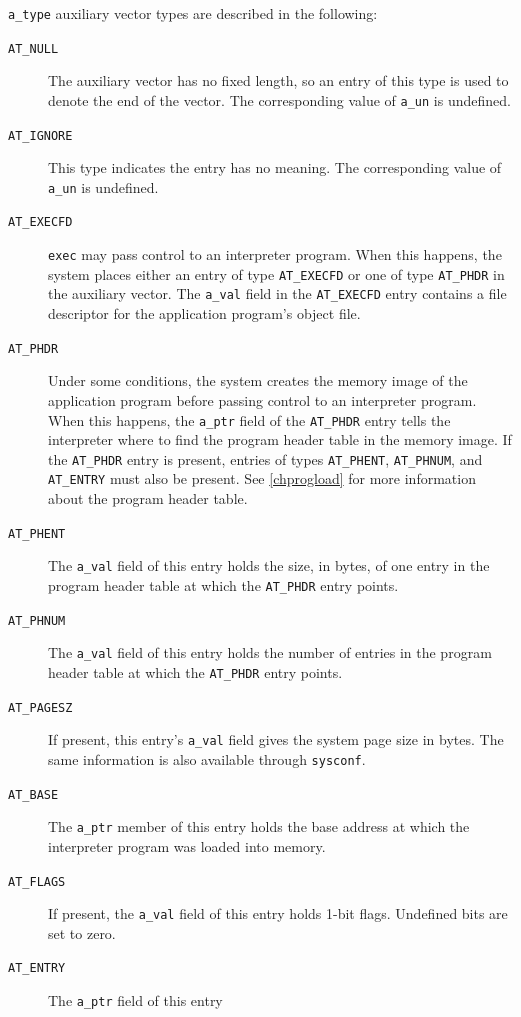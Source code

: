 \documentclass[USenglish,fontsize=11pt,twoside,%
  toc=bib,toc=idx,toc=graduated,numbers=noendperiod,
  bookmarks=true,
  bookmarksnumbered=true,
  bookmarksopen=true,
  bookmarksopenlevel=1,
  breaklinks=true,
  colorlinks=true,
  linkcolor=black,
  pdfpagelayout={TwoPageRight},
  pdfusetitle=true
]{scrreprt}
\begin{document}
\texttt{a\_type} auxiliary vector types are described in the
following:
\begin{description}
\item[\texttt{AT\_NULL}] The auxiliary vector has no fixed length, so
  an entry of this type is used to denote the end of the vector.  The
  corresponding value of \texttt{a\_un} is undefined.
\item[\texttt{AT\_IGNORE}] This type indicates the entry has no
  meaning.  The corresponding value of \texttt{a\_un} is undefined.
\item[\texttt{AT\_EXECFD}] \texttt{exec} may pass control to an interpreter
  program.  When this happens, the system places either an entry of
  type \texttt{AT\_EXECFD} or one of type \texttt{AT\_PHDR} in the
  auxiliary vector.  The \texttt{a\_val} field in the
  \texttt{AT\_EXECFD} entry contains a file descriptor for the
  application program's object file.
\item[\texttt{AT\_PHDR}] Under some conditions, the system creates the
  memory image of the application program before passing control to an
  interpreter program.  When this happens, the \texttt{a\_ptr} field of
  the \texttt{AT\_PHDR} entry tells the interpreter where to find the
  program header table in the memory image.  If the \texttt{AT\_PHDR}
  entry is present, entries of types \texttt{AT\_PHENT},
  \texttt{AT\_PHNUM}, and \texttt{AT\_ENTRY} must also be present.  See
  \cref{chprogload} for more information about the program header
  table.
\item[\texttt{AT\_PHENT}] The \texttt{a\_val} field of this entry
  holds the size, in bytes, of one entry in the program header table
  at which the \texttt{AT\_PHDR} entry points.
\item[\texttt{AT\_PHNUM}] The \texttt{a\_val} field of this entry
  holds the number of entries in the program header table at which the
  \texttt{AT\_PHDR} entry points.
\item[\texttt{AT\_PAGESZ}] If present, this entry's \texttt{a\_val}
  field gives the system page size in bytes.  The same information is
  also available through \texttt{sysconf}.
\item[\texttt{AT\_BASE}] The \texttt{a\_ptr} member of this entry
  holds the base address at which the interpreter program was loaded
  into memory.
\item[\texttt{AT\_FLAGS}] If present, the \texttt{a\_val} field of
  this entry holds 1-bit flags.  Undefined bits are set to zero.
\item[\texttt{AT\_ENTRY}] The \texttt{a\_ptr} field of this entry

\end{description}
\end{document}
